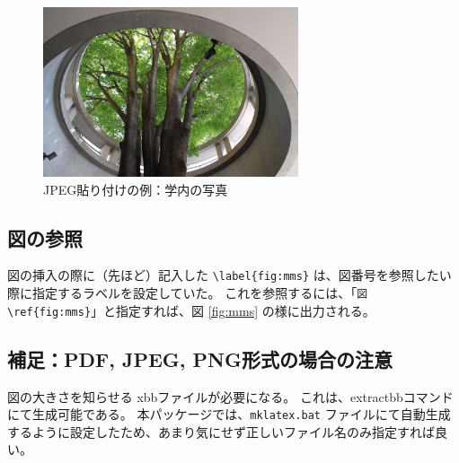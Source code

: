 \begin{figure}[H]
\centering
\includegraphics[height=5cm]{DEF059.jpg}
\caption{JPEG貼り付けの例：学内の写真}
\label{fig:sagamiC}
\end{figure}

\subsection{図の参照}
図の挿入の際に（先ほど）記入した \verb+\label{fig:mms}+ は、図番号を参照したい際に指定するラベルを設定していた。
これを参照するには、「\verb+図 \ref{fig:mms}+」と指定すれば、図 \ref{fig:mms} の様に出力される。

\subsection*{補足：PDF, JPEG, PNG形式の場合の注意}
図の大きさを知らせる xbbファイルが必要になる。
これは、extractbbコマンドにて生成可能である。
本パッケージでは、\verb+mklatex.bat+ ファイルにて自動生成するように設定したため、あまり気にせず正しいファイル名のみ指定すれば良い。


